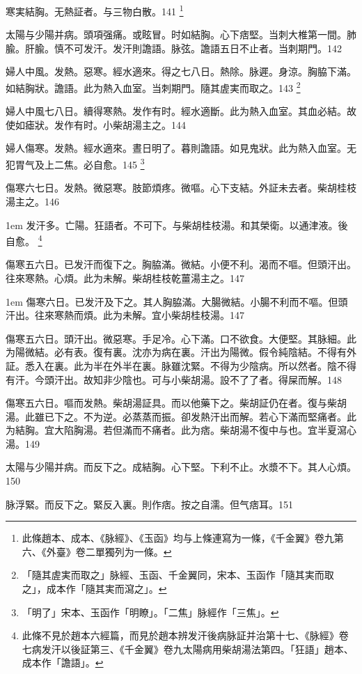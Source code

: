 寒実結胸。无熱証者。与三物白散。141
	\footnote{
		此條趙本、成本、《脉經》、《玉函》均与上條連寫为一條，《千金翼》卷九第六、《外臺》卷二單獨列为一條。
	}

太陽与少陽并病。頭項强痛。或眩冒。时如結胸。心下痞堅。当刺大椎第一間。肺腧。肝腧。慎不可发汗。发汗則譫語。脉弦。譫語五日不止者。当刺期門。142

婦人中風。发熱。惡寒。經水適來。得之七八日。熱除。脉遲。身涼。胸脇下滿。如結胸狀。譫語。此为熱入血室。当刺期門。隨其{\khaaitp 虗}実而取之。143
	\footnote{「隨其虗実而取之」脉經、玉函、千金翼同，宋本、玉函作「隨其実而取之」，成本作「隨其実而瀉之」。}

婦人中風七八日。續得寒熱。发作有时。經水適斷。此为熱入血室。其血必結。故使如瘧狀。发作有时。小柴胡湯主之。144

婦人傷寒。发熱。經水適來。晝日明了。暮則譫語。如見鬼狀。此为熱入血室。无犯胃气及上二焦。必自愈。145
	\footnote{「明了」宋本、玉函作「明瞭」。「二焦」脉經作「三焦」。}

傷寒六七日。发熱。微惡寒。肢節煩疼。微嘔。心下支結。外証未去者。柴胡桂枝湯主之。146

\hangindent 1em
发汗多。亡陽。狂語者。不可下。与柴胡桂枝湯。和其榮衛。以通津液。後自愈。
	\footnote{
		此條不見於趙本六經篇，而見於趙本辨发汗後病脉証并治第十七、《脉經》卷七病发汗以後証第三、《千金翼》卷九太陽病用柴胡湯法第四。「狂語」趙本、成本作「譫語」。
	}

傷寒五六日。已发汗而復下之。胸脇滿。微結。小便不利。渴而不嘔。但頭汗出。往來寒熱。心煩。此为未解。柴胡桂枝乾薑湯主之。147

\hangindent 1em
傷寒六日。已发汗及下之。其人胸脇滿。大腸微結。小腸不利而不嘔。但頭汗出。往來寒熱而煩。此为未解。宜小柴胡桂枝湯。{\gaoben}147

傷寒五六日。頭汗出。微惡寒。手足冷。心下滿。口不欲食。大便堅。其脉細。此为陽微結。必有表。復有裏。沈亦为病在裏。汗出为陽微。假令純陰結。不得有外証。悉入在裏。此为半在外半在裏。脉雖沈緊。不得为少陰病。所以然者。陰不得有汗。今頭汗出。故知非少陰也。可与{\khaaitp 小}柴胡湯。設不了了者。得屎而解。148

傷寒五六日。嘔而发熱。柴胡湯証具。而以他藥下之。柴胡証仍在者。復与柴胡湯。此雖已下之。不为逆。必蒸蒸而振。卻发熱汗出而解。若心下滿而堅痛者。此为結胸。宜大陷胸湯。若但滿而不痛者。此为痞。柴胡{\khaaitp 湯}不復中与也。宜半夏瀉心湯。149

太陽与少陽并病。而反下之。{\khaaitp 成}結胸。心下堅。下利不止。水漿不下。其人心煩。150

脉浮緊。而反下之。緊反入裏。則作痞。按之自濡。但气痞耳。151

